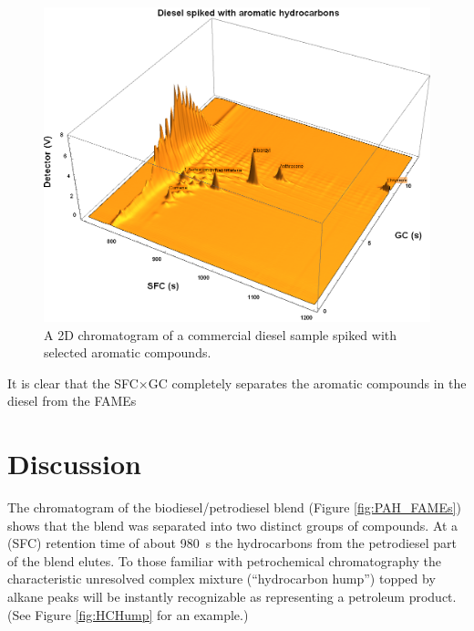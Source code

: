 \begin{figure}
	\centering
	\includegraphics[width=\textwidth]{Figures/Spiked_Diesel.png}
	\decoRule	
	
\caption[Peak assignment in spiked ]{A 2D chromatogram of a commercial diesel sample spiked with selected aromatic compounds.}

	\label{fig:Spiked_Diesel} 
\end{figure}


It is clear that the SFC×GC completely separates the aromatic compounds in the diesel from the FAMEs 





\section{Discussion}





The chromatogram of the biodiesel/petrodiesel blend (Figure \ref{fig:PAH_FAMEs}) shows
that the blend was separated into two distinct groups of compounds. At a \oneD
(SFC) retention time of about \SI{980}{\second} the hydrocarbons from the
petrodiesel part of the blend elutes. To those familiar with petrochemical
chromatography the characteristic unresolved complex mixture (``hydrocarbon
hump'') topped by alkane peaks will be instantly recognizable as representing
a petroleum product. (See Figure \ref{fig:HCHump} for an example.)

